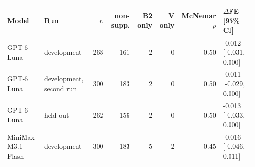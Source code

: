 \footnotesize
\setlength{\tabcolsep}{4pt}
\begin{tabular}{@{}llrrrrrl@{}}
\toprule
Model & Run & $n$ & non-supp. & B2 only & V only & McNemar $p$ & $\Delta$FE [95\% CI] \\
\midrule
GPT-6 Luna & development & 268 & 161 & 2 & 0 & 0.50 & -0.012 [-0.031, 0.000] \\
GPT-6 Luna & development, second run & 300 & 183 & 2 & 0 & 0.50 & -0.011 [-0.029, 0.000] \\
GPT-6 Luna & held-out & 262 & 156 & 2 & 0 & 0.50 & -0.013 [-0.033, 0.000] \\
MiniMax M3.1 Flash & development & 300 & 183 & 5 & 2 & 0.45 & -0.016 [-0.046, 0.011] \\
\bottomrule
\end{tabular}
